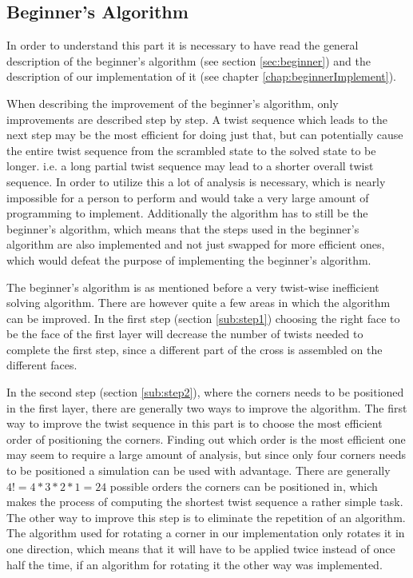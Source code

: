 \subsection{Beginner's Algorithm}
In order to understand this part it is necessary to have read the general description of the beginner's algorithm (see section \ref{sec:beginner}) and the description of our implementation of it (see chapter \ref{chap:beginnerImplement}).

When describing the improvement of the beginner's algorithm, only improvements are described step by step. 
A twist sequence which leads to the next step may be the most efficient for doing just that, but can potentially cause the entire twist sequence from the scrambled state to the solved state to be longer. 
i.e. a long partial twist sequence may lead to a shorter overall twist sequence. In order to utilize this a lot of analysis is necessary, which is nearly impossible for a person to perform and would take a very large amount of programming to implement.
Additionally the algorithm has to still be the beginner's algorithm, which means that the steps used in the beginner's algorithm are also implemented and not just swapped for more efficient ones, which would defeat the purpose of implementing the beginner's algorithm.


The beginner's algorithm is as mentioned before a very twist-wise inefficient solving algorithm. 
There are however quite a few areas in which the algorithm can be improved.
In the first step (section \ref{sub:step1}) choosing the right face to be the face of the first layer will decrease the number of twists needed to complete the first step, since a different part of the cross is assembled on the different faces.

In the second step (section \ref{sub:step2}), where the corners needs to be positioned in the first layer, there are generally two ways to improve the algorithm.
The first way to improve the twist sequence in this part is to choose the most efficient order of positioning the corners.
Finding out which order is the most efficient one may seem to require a large amount of analysis, but since only four corners needs to be positioned a simulation can be used with advantage. %
There are generally $4! = 4 * 3 * 2 * 1 = 24$ possible orders the corners can be positioned in, which makes the process of computing the shortest twist sequence a rather simple task. %
The other way to improve this step is to eliminate the repetition of an algorithm. The algorithm used for rotating a corner \cpiece{} in our implementation only rotates it in one direction, which means that it will have to be applied twice instead of once half the time, if an algorithm for rotating it the other way was implemented.

